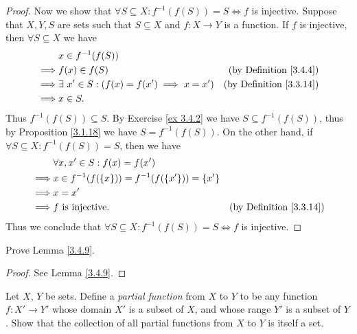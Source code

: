 \begin{proof}
    Now we show that \(\forall S \subseteq X : f^{-1}(f(S)) = S \iff f\) is injective.
    Suppose that \(X, Y, S\) are sets such that \(S \subseteq X\) and \(f : X \to Y\) is a function.
    If \(f\) is injective, then \(\forall S \subseteq X\) we have
    \begin{align*}
                 & x \in f^{-1}(f(S))                                                                       \\
        \implies & f(x) \in f(S)                                      & \text{(by Definition \ref{3.4.4})}  \\
        \implies & \exists\ x' \in S : (f(x) = f(x') \implies x = x') & \text{(by Definition \ref{3.3.14})} \\
        \implies & x \in S.
    \end{align*}
    Thus \(f^{-1}(f(S)) \subseteq S\).
    By Exercise \ref{ex 3.4.2} we have \(S \subseteq f^{-1}(f(S))\), thus by Proposition \ref{3.1.18} we have \(S = f^{-1}(f(S))\).
    On the other hand, if \(\forall S \subseteq X : f^{-1}(f(S)) = S\), then we have
    \begin{align*}
                 & \forall x, x' \in S : f(x) = f(x')                                                        \\
        \implies & x \in f^{-1}(f(\{x\})) = f^{-1}(f(\{x'\})) = \{x'\}                                       \\
        \implies & x = x'                                                                                    \\
        \implies & f \text{ is injective}.                             & \text{(by Definition \ref{3.3.14})}
    \end{align*}
    Thus we conclude that \(\forall S \subseteq X : f^{-1}(f(S)) = S \iff f\) is injective.
\end{proof}

\begin{exercise}\label{ex 3.4.6}
    Prove Lemma \ref{3.4.9}.
\end{exercise}

\begin{proof}
    See Lemma \ref{3.4.9}.
\end{proof}

\begin{exercise}\label{ex 3.4.7}
    Let \(X\), \(Y\) be sets.
    Define a \emph{partial function} from \(X\) to \(Y\) to be any function \(f : X' \to Y'\) whose domain \(X'\) is a subset of \(X\), and whose range \(Y'\) is a subset of \(Y\).
    Show that the collection of all partial functions from \(X\) to \(Y\) is itself a set.
\end{exercise}

